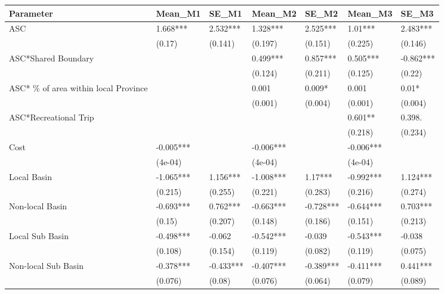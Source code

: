 \begin{table}[ht]
\centering
\begin{tabular}{lllllll}
  \hline
Parameter & Mean\_M1 & SE\_M1 & Mean\_M2 & SE\_M2 & Mean\_M3 & SE\_M3 \\ 
  \hline
ASC & 1.668*** & 2.532*** & 1.328*** & 2.525*** & 1.01*** & 2.483*** \\ 
   & (0.17) & (0.141) & (0.197) & (0.151) & (0.225) & (0.146) \\ 
  ASC*Shared Boundary &  &  & 0.499*** & 0.857*** & 0.505*** & -0.862*** \\ 
   &  &  & (0.124) & (0.211) & (0.125) & (0.22) \\ 
  ASC* \% of area within local Province &  &  & 0.001 & 0.009* & 0.001 & 0.01* \\ 
   &  &  & (0.001) & (0.004) & (0.001) & (0.004) \\ 
  ASC*Recreational Trip &  &  &  &  & 0.601** & 0.398. \\ 
   &  &  &  &  & (0.218) & (0.234) \\ 
  Cost & -0.005*** &  & -0.006*** &  & -0.006*** &  \\ 
   & (4e-04) &  & (4e-04) &  & (4e-04) &  \\ 
  Local Basin & -1.065*** & 1.156*** & -1.008*** & 1.17*** & -0.992*** & 1.124*** \\ 
   & (0.215) & (0.255) & (0.221) & (0.283) & (0.216) & (0.274) \\ 
  Non-local Basin & -0.693*** & 0.762*** & -0.663*** & -0.728*** & -0.644*** & 0.703*** \\ 
   & (0.15) & (0.207) & (0.148) & (0.186) & (0.151) & (0.213) \\ 
  Local Sub Basin & -0.498*** & -0.062 & -0.542*** & -0.039 & -0.543*** & -0.038 \\ 
   & (0.108) & (0.154) & (0.119) & (0.082) & (0.119) & (0.075) \\ 
  Non-local Sub Basin & -0.378*** & -0.433*** & -0.407*** & -0.389*** & -0.411*** & 0.441*** \\ 
   & (0.076) & (0.08) & (0.076) & (0.064) & (0.079) & (0.089) \\ 
   \hline
\end{tabular}
\end{table}
